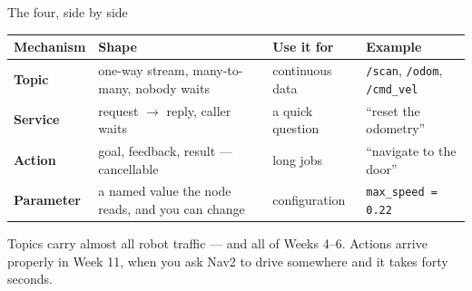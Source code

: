 \documentclass[aspectratio=169]{beamer}
\begin{document}
\begin{frame}{The four, side by side}
  \small
  \begin{center}
  \begin{tabular}{@{}p{1.9cm}p{3.3cm}p{2.5cm}p{3.0cm}@{}}
    \toprule
    \textbf{Mechanism} & \textbf{Shape} & \textbf{Use it for} & \textbf{Example} \\
    \midrule
    \textbf{Topic}
      & one-way stream, many-to-many, nobody waits
      & continuous data
      & \texttt{/scan}, \texttt{/odom}, \texttt{/cmd\_vel} \\[0.35em]
    \textbf{Service}
      & request $\rightarrow$ reply, caller waits
      & a quick question
      & ``reset the odometry'' \\[0.35em]
    \textbf{Action}
      & goal, feedback, result --- cancellable
      & long jobs
      & ``navigate to the door'' \\[0.35em]
    \textbf{Parameter}
      & a named value the node reads, and you can change
      & configuration
      & \texttt{max\_speed = 0.22} \\
    \bottomrule
  \end{tabular}
  \end{center}

  \vspace{0.5em}
  Topics carry almost all robot traffic --- and all of Weeks 4--6. Actions arrive properly in
  Week 11, when you ask Nav2 to drive somewhere and it takes forty seconds.
\end{frame}
\end{document}
